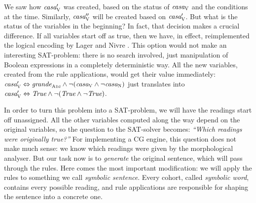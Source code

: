 We saw how $\text{\em casa}{}'_{\text{\sc V}}$ was created, based on the status of $\text{\em casa}_{\text{\sc V}}$ and the conditions at the time. Similarly, $\text{\em casa}{}''_{\text{\sc V}}$ will be created based on $\text{\em casa}{}'_{\text{\sc V}}$. 
But what is the status of the variables in the beginning?
In fact, that decision makes a crucial difference. 
If all variables start off as true, then we have, in effect, reimplemented the logical encoding by Lager and Nivre \cite{lager_nivre01}. 
This option would not make an interesting SAT-problem: 
there is no search involved, just manipulation of Boolean expressions in a completely deterministic way.
All the new variables, created from the rule applications, would get their value immediately: $\text{\em casa}{}'_{\text{\sc V}} \Leftrightarrow \text{\em grande}_{\text{\sc Adj}} \wedge \neg (\text{\em casa}_{\text{\sc V}} \wedge \neg \text{\em casa}_{\text{\sc N}})$ just translates into $\text{\em casa}{}'_{\text{\sc V}} \Leftrightarrow \text{\em True} \wedge \neg (\text{\em True} \wedge \neg \text{\em True})$. 



In order to turn this problem into a SAT-problem, we will have the readings start off
unassigned. All the other variables computed along the way depend on the original variables, so the question to the SAT-solver becomes: \emph{``Which readings were originally true?''}
For implementing a CG engine, this question does not make much sense: we know which readings were given by the morphological analyser. 
But our task now is to {\em generate} the original sentence, which will pass through the rules. 
Here comes the most important modification: we will apply the rules to something we call {\em symbolic sentence}. 
Every cohort, called {\em symbolic word}, contains every possible reading, and rule applications are responsible for shaping the sentence into a concrete one.


